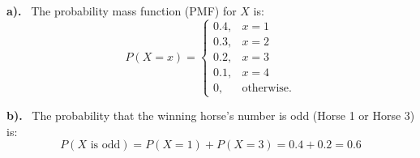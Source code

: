 \documentclass[a4paper, 10pt]{article}
\begin{document}
\begin{solution}
\par\noindent\textbf{a).} \, The probability mass function (PMF) for \( X \) is:
\[\boxed{
    P(X = x) =
    \begin{cases}
    0.4, & x=1\\
    0.3, & x=2\\
    0.2, & x=3\\
    0.1, & x=4\\
    0, & \text{otherwise.}
    \end{cases}
}\]

\vspace{2mm}

\par\noindent\textbf{b).} \, The probability that the winning horse's number is odd (Horse 1 or Horse 3) is:
\[
    P(X \text{ is odd}) = P(X = 1) + P(X = 3) = 0.4 + 0.2 = \boxed{0.6}
\]
\end{solution}
\end{document}
